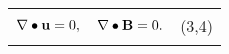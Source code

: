 \documentclass[11pt]{article}
\begin{document}


\begin{tabularx}{0.5\textwidth}{>{\tightcenter}m{1in} >{\tightcenter}m{1in} >{\tightcenter}m{1in}}
  \hline
  \begin{equation}\label{eq:divU}
    \nabla \bullet \mathbf{u} = 0 , \notag
    \addtocounter{equation}{1}
  \end{equation}
  &
  \begin{equation}\label{eq:divB}
    \nabla \bullet \mathbf{B} = 0 .    \notag
    \addtocounter{equation}{1}
  \end{equation} &
    (3,4) %
\end{tabularx}



\end{document}
